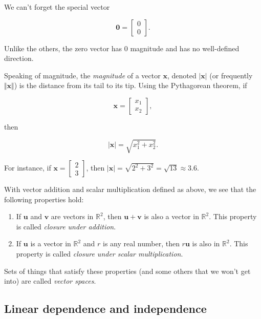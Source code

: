 \documentclass[
]{book}
\theoremstyle{definition}
\theoremstyle{definition}
\theoremstyle{definition}
\theoremstyle{definition}
\theoremstyle{remark}
\begin{document}
We can't forget the special vector

\[\mathbf{0}=\begin{bmatrix}0\\0\end{bmatrix}.\]

Unlike the others, the zero vector has 0 magnitude and has no well-defined direction.

Speaking of magnitude, the \emph{magnitude} of a vector \(\mathbf{x}\), denoted \(|\mathbf{x}|\) (or frequently \(\Vert \mathbf{x}\Vert\)) is the distance from its tail to its tip. Using the Pythagorean theorem, if

\[\mathbf{x}=\begin{bmatrix}x_1\\x_2\end{bmatrix},\]

then

\[|\mathbf{x}|=\sqrt{x_1^2+x_2^2}.\]

For instance, if \(\mathbf{x}=\begin{bmatrix}2\\3\end{bmatrix}\), then \(|\mathbf{x}|=\sqrt{2^2+3^2}=\sqrt{13}\approx 3.6\).

With vector addition and scalar multiplication defined as above, we see that the following properties hold:

\begin{enumerate}
\def\labelenumi{\arabic{enumi}.}
\item
  If \(\mathbf{u}\) and \(\mathbf{v}\) are vectors in \(\mathbb{R}^2\), then \(\mathbf{u}+\mathbf{v}\) is also a vector in \(\mathbb{R}^2\). This property is called \emph{closure under addition}.
\item
  If \(\mathbf{u}\) is a vector in \(\mathbb{R}^2\) and \(r\) is any real number, then \(r\mathbf{u}\) is also in \(\mathbb{R}^2\). This property is called \emph{closure under scalar multiplication}.
\end{enumerate}

Sets of things that satisfy these properties (and some others that we won't get into) are called \emph{vector spaces}.

\subsection*{Linear dependence and independence}\label{linear-dependence-and-independence}
\end{document}
